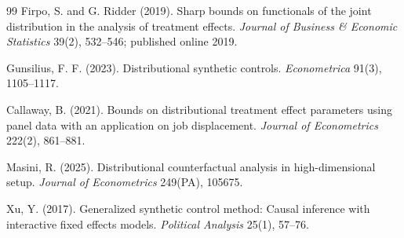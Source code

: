 \documentclass[11pt]{article}
\theoremstyle{definition}
\theoremstyle{plain}
\theoremstyle{remark}
\begin{document}
\begin{thebibliography}{99}
Firpo, S. and G. Ridder (2019).
Sharp bounds on functionals of the joint distribution in the analysis of treatment effects.
\emph{Journal of Business \& Economic Statistics} 39(2), 532--546; published online 2019.

Gunsilius, F. F. (2023).
Distributional synthetic controls.
\emph{Econometrica} 91(3), 1105--1117.

Callaway, B. (2021).
Bounds on distributional treatment effect parameters using panel data with an application on job displacement.
\emph{Journal of Econometrics} 222(2), 861--881.

Masini, R. (2025).
Distributional counterfactual analysis in high-dimensional setup.
\emph{Journal of Econometrics} 249(PA), 105675.

Xu, Y. (2017).
Generalized synthetic control method: Causal inference with interactive fixed effects models.
\emph{Political Analysis} 25(1), 57--76.
\end{thebibliography}
\end{document}
